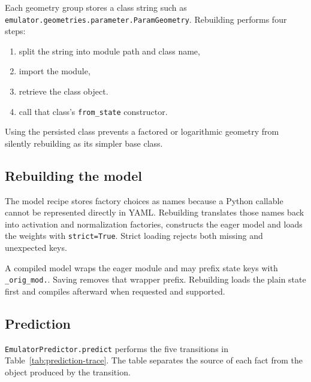 \documentclass[10pt,aps,prd,twocolumn,nofootinbib]{revtex4-2}
\newcommand{\code}[1]{\texttt{#1}}
\begin{document}
Each geometry group stores a class string such as
\code{emulator.geometries.parameter.ParamGeometry}.  Rebuilding performs four
steps:
\begin{enumerate}
  \item split the string into module path and class name,
  \item import the module,
  \item retrieve the class object.
  \item call that class's \code{from\_state} constructor.
\end{enumerate}
Using the persisted class prevents a factored or logarithmic geometry from
silently rebuilding as its simpler base class.

\subsection{Rebuilding the model}

The model recipe stores factory choices as names because a Python callable
cannot be represented directly in YAML.  Rebuilding translates those names
back into activation and normalization factories, constructs the eager model
and loads the weights with \code{strict=True}.  Strict loading rejects both
missing and unexpected keys.

A compiled model wraps the eager module and may prefix state keys with
\code{\_orig\_mod.}.  Saving removes that wrapper prefix.  Rebuilding loads the
plain state first and compiles afterward when requested and supported.

\subsection{Prediction}

\code{EmulatorPredictor.predict} performs the five transitions in
Table~\ref{tab:prediction-trace}.  The table separates the source of each fact
from the object produced by the transition.
\end{document}
